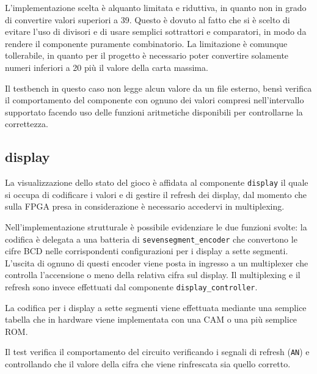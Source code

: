 \documentclass [11pt,a4paper,oneside]{article}
\newcommand{\component}[1]{\texttt{#1}}
\newcommand{\identifier}[1]{\texttt{#1}}
\begin{document}


L'implementazione scelta è alquanto limitata e riduttiva, in quanto
non in grado di convertire valori superiori a 39. Questo è dovuto al
fatto che si è scelto di evitare l'uso di divisori e di usare semplici
sottrattori e comparatori, in modo da rendere il componente puramente
combinatorio. La limitazione è comunque tollerabile, in quanto per il
progetto è necessario poter convertire solamente numeri inferiori a
20 più il valore della carta massima.



Il testbench in questo caso non legge alcun valore da un file esterno,
bensì verifica il comportamento del componente con ognuno dei valori
compresi nell'intervallo supportato facendo uso delle funzioni
aritmetiche disponibili per controllarne la correttezza.

\subsection{display}

La visualizzazione dello stato del gioco è affidata al componente
\component{display} il quale si occupa di codificare i valori e di gestire
il refresh dei display, dal momento che sulla FPGA presa in 
considerazione è necessario accedervi in multiplexing.



Nell'implementazione strutturale è possibile evidenziare le due
funzioni svolte: la codifica è delegata a una batteria di
\component{sevensegment\_encoder} che convertono le cifre BCD nelle
corrispondenti configurazioni per i display a sette segmenti.
L'uscita di ognuno di questi encoder viene posta in ingresso a
un multiplexer che controlla l'accensione o meno della relativa
cifra sul display. Il multiplexing e il refresh sono invece
effettuati dal componente \component{display\_controller}.



La codifica per i display a sette segmenti viene effettuata
mediante una semplice tabella che in hardware viene
implementata con una CAM o una più semplice ROM.



Il test verifica il comportamento del circuito verificando
i segnali di refresh (\identifier{AN}) e controllando che il valore
della cifra che viene rinfrescata sia quello corretto.
\end{document}

